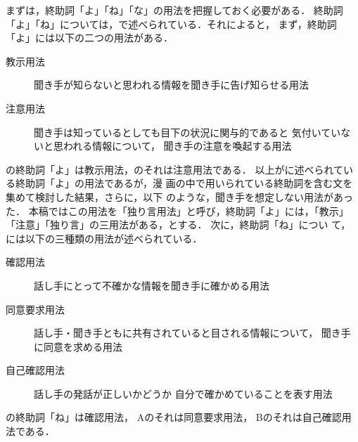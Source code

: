 まずは，終助詞「よ」「ね」「な」の用法を把握しておく必要がある．  終助詞
「よ」「ね」については，\cite{kinsui93-3}で述べられている．それによると，
まず，終助詞「よ」には以下の二つの用法がある．
\begin{description}
\item[教示用法] 聞き手が知らないと思われる情報を聞き手に告げ知らせる用法
\item[注意用法] 聞き手は知っているとしても目下の状況に関与的であると
                気付いていないと思われる情報について，
                聞き手の注意を喚起する用法
\end{description}
の終助詞「よ」は教示用法，のそれは注意用法である．
 \label{teach}
 \label{remind}
以上が\cite{kinsui93-3}に述べられている終助詞「よ」の用法であるが，漫
画の中で用いられている終助詞を含む文を集めて検討した結果，さらに，以下
のような，聞き手を想定しない用法があった．
\label{hitori1}
\label{hitori2}
本稿ではこの用法を「{\dg 独り言用法}」と呼び，終助詞「よ」には，「教示」
「注意」「独り言」の三用法がある，とする．  次に，終助詞「ね」につい
て，\cite{kinsui93-3}には以下の三種類の用法が述べられている．
\begin{description}
\item[確認用法]     話し手にとって不確かな情報を聞き手に確かめる用法
\item[同意要求用法] 話し手・聞き手ともに共有されていると目される情報について，
                    聞き手に同意を求める用法
\item[自己確認用法] 話し手の発話が正しいかどうか
                    自分で確かめていることを表す用法
\end{description}
の終助詞「ね」は確認用法，
Aのそれは同意要求用法，
Bのそれは自己確認用法である．
